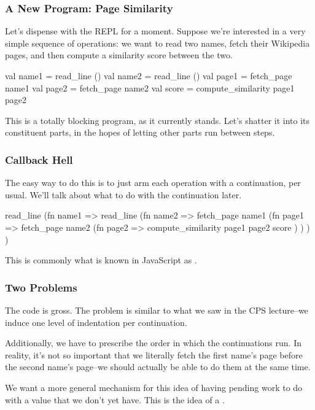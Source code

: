 \documentclass[aspectratio=169]{beamer}
\begin{document}
\begin{frame}[fragile]
  \frametitle{A New Program: Page Similarity}

  Let's dispense with the REPL for a moment. Suppose we're interested in
  a very simple sequence of operations: we want to read two names, fetch
  their Wikipedia pages, and then compute a similarity score between the two.

  \pause
  \vspace{\fill}

  \begin{codeblock}
    val name1 = read_line ()
    val name2 = read_line ()
    val page1 = fetch_page name1
    val page2 = fetch_page name2
    val score = compute_similarity page1 page2
\end{codeblock}

  \pause
  \vspace{\fill}

  This is a totally blocking program, as it currently stands. Let's
  shatter it into its constituent parts, in the hopes of letting other
  parts run between steps.
\end{frame}

\begin{frame}[fragile]
  \frametitle{Callback Hell}

  The easy way to do this is to just arm each operation with a
  continuation, per usual. We'll talk about what to do with the
  continuation later.

  \pause
  \vspace{\fill}

  \begin{codeblock}
    read_line (fn name1 =>
      read_line (fn name2 =>
        fetch_page name1 (fn page1 =>
          fetch_page name2 (fn page2 =>
            compute_similarity page1 page2 score
          )
        )
      )
    )
\end{codeblock}

  \pause
  \vspace{\fill}

  This is commonly what is known in JavaScript as
  .
\end{frame}
\begin{frame}[fragile]
  \frametitle{Two Problems}

  The code is gross. The problem is similar to what we saw in the
  CPS lecture--we induce one level of indentation per continuation.

  \pause
  \vspace{\fill}

  Additionally, we have to prescribe the order in which the continuations
  run. In reality, it's not so important that we literally fetch the
  first name's page before the second name's page--we should actually
  be able to do them at the same time.

  \pause
  \vspace{\fill}

  We want a more general mechanism for this idea of having pending
  work to do with a value that we don't yet have. This is the idea of
  a .
\end{frame}
\end{document}
